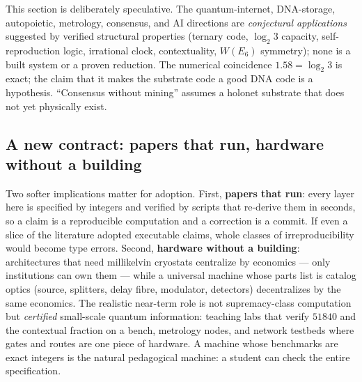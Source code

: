 \documentclass[11pt]{article}
\begin{document}
\begin{honestbox}
This section is deliberately speculative. The quantum-internet, DNA-storage, autopoietic, metrology,
consensus, and AI directions are \emph{conjectural applications} suggested by verified structural
properties (ternary code, $\log_2 3$ capacity, self-reproduction logic, irrational clock,
contextuality, $W(E_6)$ symmetry); none is a built system or a proven reduction. The numerical
coincidence $1.58=\log_2 3$ is exact; the claim that it makes the substrate code a good DNA code is a
hypothesis. ``Consensus without mining'' assumes a holonet substrate that does not yet physically exist.
\end{honestbox}

\subsection{A new contract: papers that run, hardware without a building}
Two softer implications matter for adoption. First, \textbf{papers that run}: every layer here is
specified by integers and verified by scripts that re-derive them in seconds, so a claim is a
reproducible computation and a correction is a commit. If even a slice of the literature adopted
executable claims, whole classes of irreproducibility would become type errors. Second,
\textbf{hardware without a building}: architectures that need millikelvin cryostats centralize by
economics --- only institutions can own them --- while a universal machine whose parts list is catalog
optics (source, splitters, delay fibre, modulator, detectors) decentralizes by the same economics. The
realistic near-term role is not supremacy-class computation but \emph{certified} small-scale quantum
information: teaching labs that verify $51840$ and the contextual fraction on a bench, metrology nodes,
and network testbeds where gates and routes are one piece of hardware. A machine whose benchmarks are
exact integers is the natural pedagogical machine: a student can check the entire specification.
\end{document}
